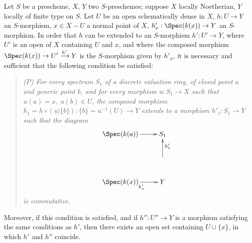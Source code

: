 \begin{proposition}[20.4.6]
\label{IV.20.4.6}
Let $S$ be a prescheme, $X$, $Y$ two $S$-preschemes;
suppose $X$ locally Noetherian, $Y$ locally of finite type on $S$.
Let $U$ be an open schematically dense in $X$, $h:U\to Y$ an $S$-morphism, $x\in X-U$ a normal point of $X$, $h'_x:\Spec(k(x))\to Y$ an $S$-morphism.
In order that $h$ can be extended to an $S$-morphism $h':U'\to Y$, where $U'$ is an open of $X$ containing $U$ and $x$, and where the composed morphism $\Spec(k(x))\to U'\xrightarrow{h'}Y$ is the $S$-morphism given by $h'_x$, it is necessary and sufficient that the following condition be satisfied:
\begin{quote}
\emph{(P) For every spectrum $S_1$ of a discrete valuation ring, of closed point $a$ and generic point $b$, and for every morphism $u:S_1\to X$ such that $u(a)=x$, $u(b)\in U$, the composed morphism $h_1=h\circ(u|\{b\}):\{b\}=u^{-1}(U)\to Y$ extends to a morphism $h'_1:S_1\to Y$ such that the diagram}
\[
  \xymatrix{
  \Spec(k(a)) \ar[r] & S_1 \\
  & \ar[u]_{h'_1} \\
  \Spec(k(x)) \ar[r]_{h'_x} & Y
  }
\]
\emph{is commutative.}
\end{quote}
Moreover, if this condition is satisfied, and if $h'':U''\to Y$ is a morphism satisfying the same conditions as $h'$, then there exists an open set containing $U\cup\{x\}$, in which $h'$ and $h''$ coincide.
\end{proposition}

